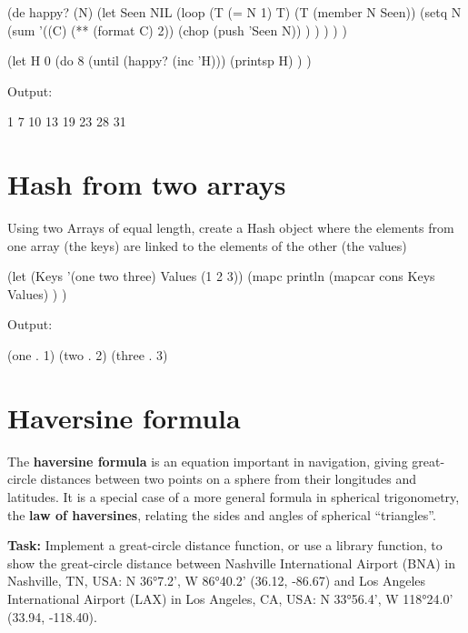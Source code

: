 \begin{wideverbatim}

(de happy? (N)
   (let Seen NIL
      (loop
         (T (= N 1) T)
         (T (member N Seen))
         (setq N
            (sum '((C) (** (format C) 2))
               (chop (push 'Seen N)) ) ) ) ) )

(let H 0
   (do 8
      (until (happy? (inc 'H)))
      (printsp H) ) )

Output:

1 7 10 13 19 23 28 31

\end{wideverbatim}

\pagebreak{}
\section*{Hash from two arrays}

Using two Arrays of equal length, create a Hash object where the
elements from one array (the keys) are linked to the elements of the
other (the values)

\begin{wideverbatim}

(let (Keys '(one two three)  Values (1 2 3))
   (mapc println
      (mapcar cons Keys Values) ) )

Output:

(one . 1)
(two . 2)
(three . 3)

\end{wideverbatim}

\pagebreak{}
\section*{Haversine formula}

The \textbf{haversine formula} is an equation important in navigation,
giving great-circle distances between two points on a sphere from their
longitudes and latitudes. It is a special case of a more general formula
in spherical trigonometry, the \textbf{law of haversines}, relating the
sides and angles of spherical ``triangles''.

\textbf{Task:} Implement a great-circle distance function, or use a
library function, to show the great-circle distance between Nashville
International Airport (BNA) in Nashville, TN, USA: N 36°7.2', W 86°40.2'
(36.12, -86.67) and Los Angeles International Airport (LAX) in Los
Angeles, CA, USA: N 33°56.4', W 118°24.0' (33.94, -118.40).

